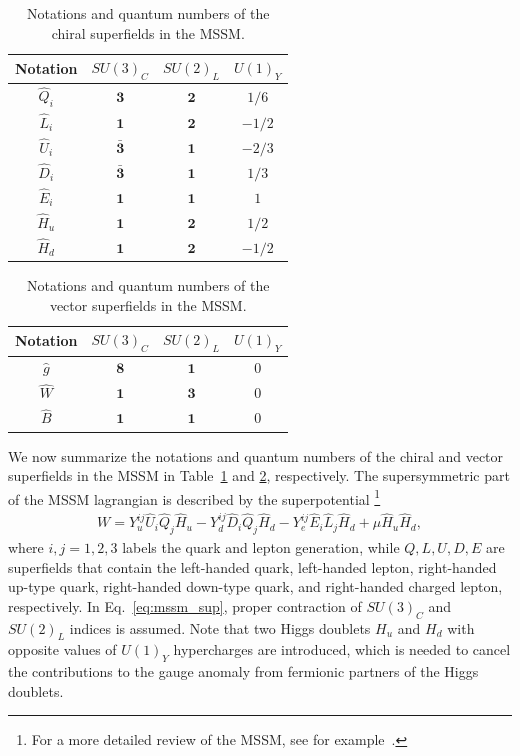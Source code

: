 \documentclass[12pt,twoside,book]{article}
\begin{document}
\begin{table}[t]
  \centering
  \begin{tabular}{c|ccc}
    Notation & $SU(3)_C$ & $SU(2)_L$ & $U(1)_Y$ \\ \hline
    $\hat{Q}_i$ & $\bm{3}$ & $\bm{2}$ & $1/6$ \\
    $\hat{L}_i$ & $\bm{1}$ & $\bm{2}$ & $-1/2$ \\
    $\hat{U}_i$ & $\bar{\bm{3}}$ & $\bm{1}$ & $-2/3$ \\
    $\hat{D}_i$ & $\bar{\bm{3}}$ & $\bm{1}$ & $1/3$ \\
    $\hat{E}_i$ & $\bm{1}$ & $\bm{1}$ & $1$ \\
    $\hat{H}_u$ & $\bm{1}$ & $\bm{2}$ & $1/2$ \\
    $\hat{H}_d$ & $\bm{1}$ & $\bm{2}$ & $-1/2$
  \end{tabular}
  \caption{Notations and quantum numbers of the chiral superfields in the MSSM.}
  \label{tab:mssm_csf}
\end{table}

\begin{table}[t]
  \centering
  \begin{tabular}{c|ccc}
    Notation & $SU(3)_C$ & $SU(2)_L$ & $U(1)_Y$ \\ \hline
    $\hat{g}$ & $\bm{8}$ & $\bm{1}$ & $0$ \\
    $\hat{W}$ & $\bm{1}$ & $\bm{3}$ & $0$ \\
    $\hat{B}$ & $\bm{1}$ & $\bm{1}$ & $0$ \\
  \end{tabular}
  \caption{Notations and quantum numbers of the vector superfields in the MSSM.}
  \label{tab:mssm_vsf}
\end{table}

We now summarize the notations and quantum numbers of the chiral and vector superfields in the MSSM in Table~\ref{tab:mssm_csf} and \ref{tab:mssm_vsf}, respectively.
The supersymmetric part of the MSSM lagrangian is described by the superpotential
\footnote{
  For a more detailed review of the MSSM, see for example~\cite{Martin:1997ns}.
}
\begin{align}
  W = Y_u^{i j} \hat{U}_i \hat{Q}_j \hat{H}_u - Y_d^{i j} \hat{D}_i \hat{Q}_j \hat{H}_d
  - Y_e^{i j} \hat{E}_i \hat{L}_j \hat{H}_d + \mu \hat{H}_u \hat{H}_d,
  \label{eq:mssm_sup}
\end{align}
where $i,j=1,2,3$ labels the quark and lepton generation, while $Q, L, U, D, E$ are superfields that contain the left-handed quark, left-handed lepton, right-handed up-type quark, right-handed down-type quark, and right-handed charged lepton, respectively.
In Eq.~\eqref{eq:mssm_sup}, proper contraction of $SU(3)_C$ and $SU(2)_L$ indices is assumed.
Note that two Higgs doublets $H_u$ and $H_d$ with opposite values of $U(1)_Y$ hypercharges are introduced, which is needed to cancel the contributions to the gauge anomaly from fermionic partners of the Higgs doublets.
\end{document}
